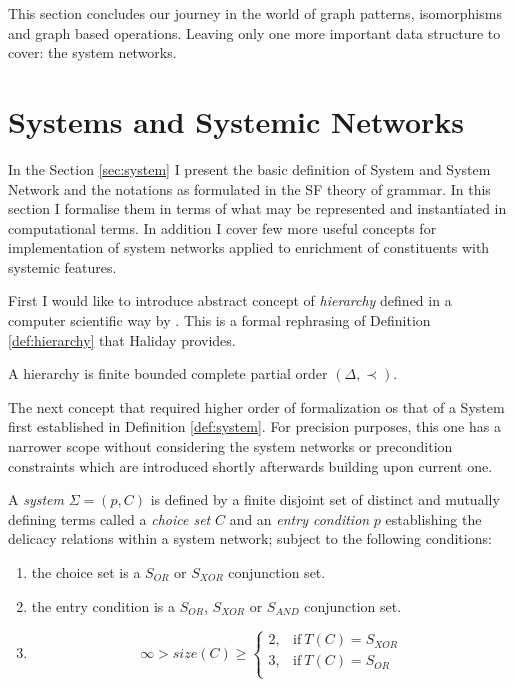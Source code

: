 This section concludes our journey in the world of graph patterns, isomorphisms and graph based operations. Leaving only one more important data structure to cover: the system networks. 

\section{Systems and Systemic Networks}
In the Section \ref{sec:system} I present the basic definition of System and System Network and the notations as formulated in the SF theory of grammar. In this section I formalise them in terms of what may be represented and instantiated in computational terms. In addition I cover few more useful concepts for implementation of system networks applied to enrichment of constituents with systemic features. 

First I would like to introduce abstract concept of \textit{hierarchy} defined in a computer scientific way by \citet{Pollard1987}. This is a formal rephrasing of Definition \ref{def:hierarchy} that Haliday provides.

\begin{definition}[Hierarchy]\label{def:hierarchy-cs}
	A hierarchy is finite bounded complete partial order $(\varDelta,\prec)$. 
\end{definition}

The next concept that required higher order of formalization os that of a System first established in Definition \ref{def:system}. For precision purposes, this one has a narrower scope without considering the system networks or precondition constraints which are introduced shortly afterwards building upon current one.

\begin{definition}[System]\label{def:formal-system}
A \textit{system} $\Sigma=(p,C)$ is defined by a finite disjoint set of distinct and mutually defining terms called a \textit{choice set} $C$ and an \textit{entry condition} $p$ establishing the delicacy relations within a system network; subject to the following conditions: 
\begin{enumerate}
	\item the choice set is a $S_{OR}$ or $S_{XOR}$ conjunction set.
	\item the entry condition is a $S_{OR}$, $S_{XOR}$ or $S_{AND}$ conjunction set.
	\item \begin{equation*}
	\infty > size(C) \geq
	\begin{cases}
	2, & \text{if}\ T(C) = S_{XOR} \\
	3, & \text{if}\ T(C) = S_{OR} \\
	\end{cases}
	\end{equation*}
\end{enumerate} 
\end{definition}

